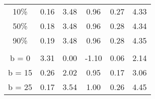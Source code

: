 \begin{tabular}{cccccc}
10\% & 0.16                      & 3.48          & 0.96            & 0.27             & 4.33          \\
50\% & 0.18                      & 3.48          & 0.96            & 0.28             & 4.34          \\
90\% & 0.19                      & 3.48          & 0.96            & 0.28             & 4.35    \\  

\addlinespace
 
 
 \hline
 \addlinespace
\multicolumn{6}{l}{$p^a$ = \$41.1}  \\

 b = 0  &  3.31 &  0.00 & -1.10 &  0.06 &  2.14 \\
 b = 15 & 0.26 &  2.02 &  0.95 &  0.17 &  3.06 \\
  b = 25 &  0.17 &  3.54 &  1.00 &  0.26 &  4.45 \\
\bottomrule

\end{tabular}


 








